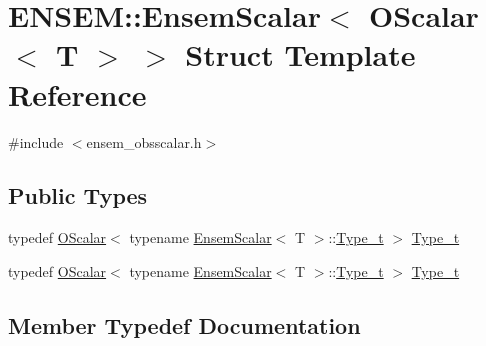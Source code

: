 \hypertarget{structENSEM_1_1EnsemScalar_3_01OScalar_3_01T_01_4_01_4}{}\section{E\+N\+S\+EM\+:\+:Ensem\+Scalar$<$ O\+Scalar$<$ T $>$ $>$ Struct Template Reference}
\label{structENSEM_1_1EnsemScalar_3_01OScalar_3_01T_01_4_01_4}


{\ttfamily \#include $<$ensem\+\_\+obsscalar.\+h$>$}

\subsection*{Public Types}
\begin{DoxyCompactItemize}
\item 
typedef \mbox{\hyperlink{classENSEM_1_1OScalar}{O\+Scalar}}$<$ typename \mbox{\hyperlink{structENSEM_1_1EnsemScalar}{Ensem\+Scalar}}$<$ T $>$\+::\mbox{\hyperlink{structENSEM_1_1EnsemScalar_3_01OScalar_3_01T_01_4_01_4_ae59bb2dba9a4ddf192256b4beaf9a856}{Type\+\_\+t}} $>$ \mbox{\hyperlink{structENSEM_1_1EnsemScalar_3_01OScalar_3_01T_01_4_01_4_ae59bb2dba9a4ddf192256b4beaf9a856}{Type\+\_\+t}}
\item 
typedef \mbox{\hyperlink{classENSEM_1_1OScalar}{O\+Scalar}}$<$ typename \mbox{\hyperlink{structENSEM_1_1EnsemScalar}{Ensem\+Scalar}}$<$ T $>$\+::\mbox{\hyperlink{structENSEM_1_1EnsemScalar_3_01OScalar_3_01T_01_4_01_4_ae59bb2dba9a4ddf192256b4beaf9a856}{Type\+\_\+t}} $>$ \mbox{\hyperlink{structENSEM_1_1EnsemScalar_3_01OScalar_3_01T_01_4_01_4_ae59bb2dba9a4ddf192256b4beaf9a856}{Type\+\_\+t}}
\end{DoxyCompactItemize}


\subsection{Member Typedef Documentation}
\mbox{\label{structENSEM_1_1EnsemScalar_3_01OScalar_3_01T_01_4_01_4_ae59bb2dba9a4ddf192256b4beaf9a856}} 
